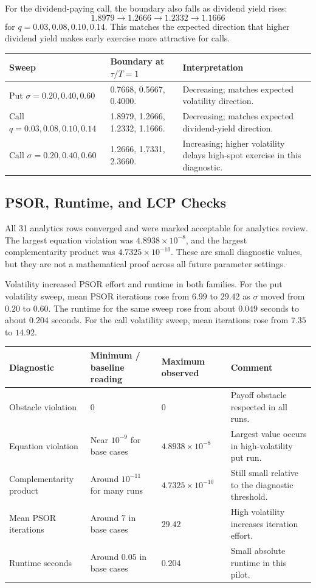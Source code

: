 \documentclass[11pt,a4paper]{article}
\begin{document}
For the dividend-paying call, the boundary also falls as dividend yield rises:
\[
1.8979 \rightarrow 1.2666 \rightarrow 1.2332 \rightarrow 1.1666
\]
for \(q=0.03,0.08,0.10,0.14\). This matches the expected direction that higher dividend yield
makes early exercise more attractive for calls.

\begin{longtable}{L{0.23\textwidth} L{0.30\textwidth} L{0.31\textwidth}}
\toprule
Sweep & Boundary at \(\tau/T=1\) & Interpretation \\
\midrule
\endhead
Put \(\sigma=0.20,0.40,0.60\) & 0.7668, 0.5667, 0.4000. & Decreasing; matches expected volatility direction. \\
Call \(q=0.03,0.08,0.10,0.14\) & 1.8979, 1.2666, 1.2332, 1.1666. & Decreasing; matches expected dividend-yield direction. \\
Call \(\sigma=0.20,0.40,0.60\) & 1.2666, 1.7331, 2.3660. & Increasing; higher volatility delays high-spot exercise in this diagnostic. \\
\bottomrule
\end{longtable}

\subsection{PSOR, Runtime, and LCP Checks}

All 31 analytics rows converged and were marked acceptable for analytics review. The largest
equation violation was \(4.8938\times 10^{-8}\), and the largest complementarity product was
\(4.7325\times 10^{-10}\). These are small diagnostic values, but they are not a mathematical
proof across all future parameter settings.

Volatility increased PSOR effort and runtime in both families. For the put volatility sweep, mean
PSOR iterations rose from \(6.99\) to \(29.42\) as \(\sigma\) moved from \(0.20\) to \(0.60\). The
runtime for the same sweep rose from about \(0.049\) seconds to about \(0.204\) seconds. For the
call volatility sweep, mean iterations rose from \(7.35\) to \(14.92\).

\begin{longtable}{L{0.28\textwidth} L{0.20\textwidth} L{0.20\textwidth} L{0.20\textwidth}}
\toprule
Diagnostic & Minimum / baseline reading & Maximum observed & Comment \\
\midrule
\endhead
Obstacle violation & \(0\) & \(0\) & Payoff obstacle respected in all runs. \\
Equation violation & Near \(10^{-9}\) for base cases & \(4.8938\times10^{-8}\) & Largest value occurs in high-volatility put run. \\
Complementarity product & Around \(10^{-11}\) for many runs & \(4.7325\times10^{-10}\) & Still small relative to the diagnostic threshold. \\
Mean PSOR iterations & Around \(7\) in base cases & \(29.42\) & High volatility increases iteration effort. \\
Runtime seconds & Around \(0.05\) in base cases & \(0.204\) & Small absolute runtime in this pilot. \\
\bottomrule
\end{longtable}
\end{document}
